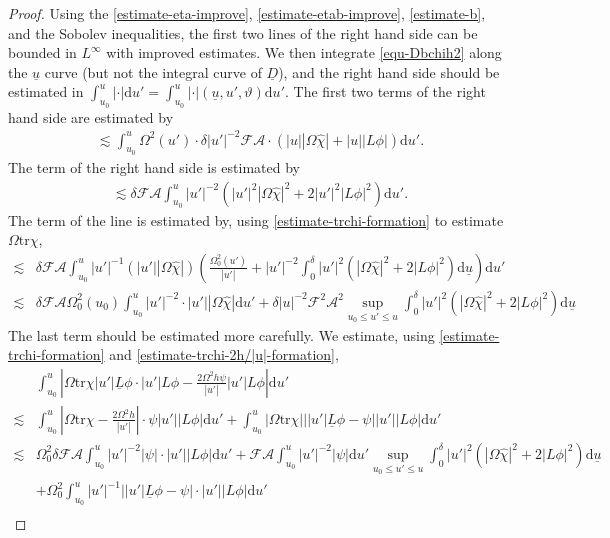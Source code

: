 \documentclass[11pt,reqno]{amsart}
\theoremstyle{definition}
\numberwithin{equation}{section}
\newcommand{\D}{\mathrm{d}}
\newcommand{\tr}{\mathrm{tr}}
\def\chih{\widehat{\chi}}
\def\Lb{\underline{L}}
\def\tr{\mathrm{tr}}
\def\ub{\underline{u}}
\newcommand{\Db}{\underline{D}}
\begin{document}
\begin{proof}
Using the \eqref{estimate-eta-improve}, \eqref{estimate-etab-improve}, \eqref{estimate-b}, and the Sobolev inequalities, the first two lines of the right hand side can be bounded in $L^\infty$ with improved estimates. We then integrate \eqref{equ-Dbchih2} along the $\ub$ curve (but not the integral curve of $\Db$), and the right hand side should be estimated in $\int_{u_0}^u|\cdot|\D u'=\int_{u_0}^u|\cdot|(\ub,u',\vartheta)\D u'$. The first two terms of the right hand side are estimated by
\begin{align*}
\lesssim\int_{u_0}^u\Omega^2(u')\cdot\delta|u'|^{-2}\mathscr{F}\mathcal{A}\cdot(|u||\Omega\chih|+|u||L\phi|)\D u'.
\end{align*}
The  term of the right hand side is estimated by
\begin{align*}
\lesssim\delta\mathscr{F}\mathcal{A}\int_{u_0}^u|u'|^{-2}(|u'|^2|\Omega\chih|^2+2|u'|^2|L\phi|^2)\D u'.
\end{align*}
The  term of the  line is estimated by, using \eqref{estimate-trchi-formation} to estimate $\Omega\tr\chi$,
\begin{align*}
\lesssim&\delta\mathscr{F}\mathcal{A}\int_{u_0}^u|u'|^{-1}(|u'||\Omega\chih|)\left(\frac{\Omega_0^2(u')}{|u'|}+|u'|^{-2}\int_0^{\delta}|u'|^2(|\Omega\chih|^2+2|L\phi|^2)\D\ub\right)\D u'\\
\lesssim&\delta\mathscr{F}\mathcal{A}\Omega_0^2(u_0)\int_{u_0}^u|u'|^{-2}\cdot|u'||\Omega\chih|\D u'+\delta|u|^{-2}\mathscr{F}^2\mathcal{A}^2\sup_{u_0\le u'\le u}\int_0^{\delta}|u'|^2\left(|\Omega\chih|^2+2|L\phi|^2\right)\D\ub
\end{align*}
The last term should be estimated more carefully. We estimate, using \eqref{estimate-trchi-formation} and \eqref{estimate-trchi-2h/|u|-formation},
\begin{align*}
&\int_{u_0}^u\left|\Omega\tr\chi|u'|\Lb\phi\cdot|u'|L\phi-\frac{2\Omega^2h\psi}{|u'|}|u'|L\phi\right|\D u'\\
\lesssim&\int_{u_0}^u\left|\Omega\tr\chi-\frac{2\Omega^2h}{|u'|}\right|\cdot\psi|u'||L\phi|\D u'+\int_{u_0}^u|\Omega\tr\chi|||u'|\Lb\phi-\psi||u'||L\phi|\D u'\\
\lesssim&\Omega_0^2\delta\mathscr{F}\mathcal{A}\int_{u_0}^u|u'|^{-2}|\psi|\cdot|u'||L\phi|\D u'+\mathscr{F}\mathcal{A}\int_{u_0}^u|u'|^{-2}|\psi|\D u'\sup_{u_0\le u'\le u}\int_0^{\delta}|u'|^2(|\Omega\chih|^2+2|L\phi|^2)\D\ub\\
&+\Omega_0^2\int_{u_0}^u|u'|^{-1}||u'|\Lb\phi-\psi|\cdot|u'||L\phi|\D u'\\

\end{align*}
\end{proof}
\end{document}
